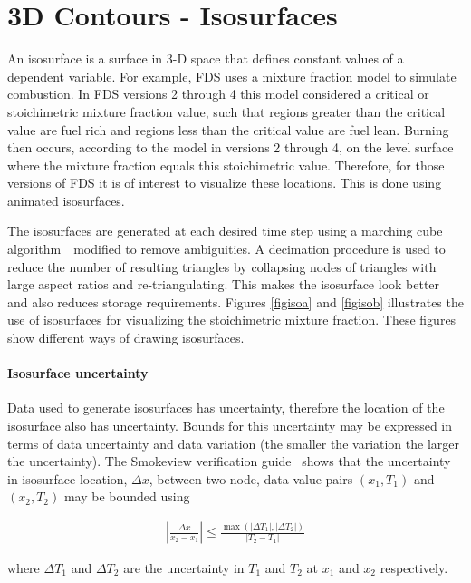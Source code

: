 \documentclass[11pt,twoside]{book}
\begin{document}
%
%

\clearpage
\section{3D Contours - Isosurfaces}
An isosurface is a surface in 3-D space that defines constant
values of a dependent variable. For example, FDS uses a mixture
fraction model to simulate combustion. In FDS versions 2 through 4
this model considered a critical or stoichimetric mixture fraction
value, such that regions greater than the critical value are fuel
rich and regions less than the critical value are fuel lean.
Burning then occurs, according to the model in versions 2 through
4, on the level surface where the mixture fraction equals this
stoichimetric value. Therefore, for those versions of FDS it is of
interest to visualize these locations. This is done using animated
isosurfaces.

The isosurfaces are generated at each desired time step using a
marching cube algorithm~\cite{marchingcubes}\ modified to remove
ambiguities. A decimation procedure is used to reduce the number
of resulting triangles by collapsing nodes of triangles with large
aspect ratios and re-triangulating. This makes the isosurface look
better and also reduces storage requirements. Figures
\ref{figisoa} and \ref{figisob} illustrates the use of isosurfaces
for visualizing the stoichimetric mixture fraction. These figures
show different ways of drawing isosurfaces.

\paragraph{Isosurface uncertainty} Data used to generate isosurfaces has uncertainty, therefore the location of the isosurface
also has uncertainty.  Bounds for this uncertainty may be expressed in terms of data uncertainty and data variation (the smaller the variation the larger the uncertainty).
The Smokeview verification guide~\cite{Smokeview_Verification_Guide} shows that the uncertainty in isosurface location, $\Delta x$, between two node, data value pairs $(x_1,T_1)$ and $(x_2,T_2)$  may be bounded using

\begin{eqnarray*}
\left|\frac{\Delta x}{x_2-x_1}\right|\le
\frac{\max(|\Delta T_1|,|\Delta T_2|)}{|T_2-T_1|}
\end{eqnarray*}

\noindent where $\Delta T_1$ and $\Delta T_2$ are the uncertainty in $T_1$ and $T_2$ at $x_1$ and $x_2$ respectively.
\end{document}
